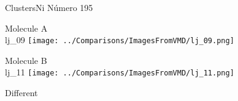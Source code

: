  \newpage

\vtab[-3cm]
\begin{center}
{\large ClustersNi \tab Número 195}
\end{center}
\begin{multicols}{2}
\begin{center}
Molecule A \\ 
lj\_09
\texttt{[image: ../Comparisons/ImagesFromVMD/lj\_09.png]}
\\
\vtab

\columnbreak
Molecule B \\ 
lj\_11
\texttt{[image: ../Comparisons/ImagesFromVMD/lj\_11.png]}
\\
\vtab


\end{center}
\end{multicols}
\begin{center}
\textcolor{NavyBlue}{\Large Different}
\end{center}

 \newpage

